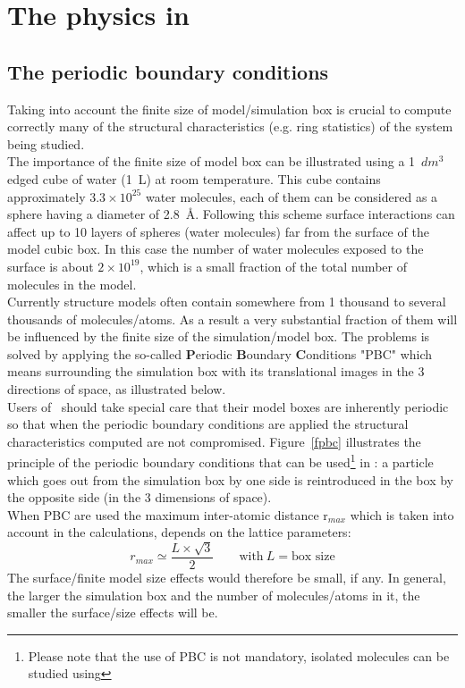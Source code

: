 \chapter{The physics in \atomes}
\label{physics}

\section{The periodic boundary conditions}
\label{pbc}

Taking into account the finite size of model/simulation box is crucial to compute correctly many of the structural characteristics (e.g. ring statistics) of the system being studied. \\
The importance of the finite size of model box can be illustrated using a 1~$dm^3$ edged cube of water (1~L) at room temperature. 
This cube contains approximately $3.3 \times 10^{25}$ water molecules, each of them can be considered as a sphere having a diameter of 2.8~\AA. 
Following this scheme surface interactions can affect up to 10 layers of spheres (water molecules) far from the surface of the model cubic box. 
In this case the number of water molecules exposed to the surface is about $2 \times 10^{19}$, 
which is a small fraction of the total number of molecules in the model. \\
Currently structure models often contain somewhere from 1 thousand to several thousands of molecules/atoms. 
As a result a very substantial fraction of them will be influenced by the finite size of the simulation/model box. 
The problems is solved by applying the so-called {\bf{P}}eriodic {\bf{B}}oundary {\bf{C}}onditions "PBC" which means surrounding the simulation box with its translational images in the 3 directions of space, as illustrated below. \\[0.25cm]
Users of \atomes\ should take special care that their model boxes are inherently periodic so that when the periodic boundary conditions are applied the structural characteristics computed are not compromised. 
\newpage
{}
\noindent Figure~\ref{fpbc} illustrates the principle of the periodic boundary conditions that can be used\footnote{Please note that the use of PBC is not mandatory, isolated molecules can be studied using \atomes} in \atomes: a particle which goes out from the simulation box by one side is reintroduced in the box by the opposite side (in the 3 dimensions of space). \\[0.25cm]
When PBC are used the maximum inter-atomic distance r$_{max}$ which is taken into account in the calculations, depends on the lattice parameters:
\begin{equation}
	r_{max} \simeq \frac{L\times\sqrt{3}}{2}\qquad \text{with}\ L = \text{box size}
\end{equation}
The surface/finite model size effects would therefore be small, if any. 
In general, the larger the simulation box and the number of molecules/atoms in it, the smaller the surface/size effects will be.
\newpage
